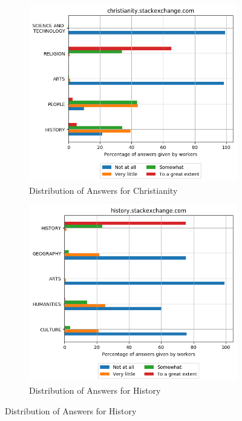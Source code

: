 \begin{figure}[H]
        
     \begin{subfigure}{0.5\textwidth}
    \centering
        \includegraphics[width=1\linewidth]{imgs/crowd-results/christianity_stackexchange_com}
        \caption{Distribution of Answers for Christianity}
        \label{fig:crowd-results-christianity}
    \end{subfigure}%
    \begin{subfigure}{0.5\textwidth}
    \centering
        \includegraphics[width=1\linewidth]{imgs/crowd-results/history_stackexchange_com}
        \caption {Distribution of Answers for  History}
        \label{fig:crowd-results-history}
    \end{subfigure} 

    \end{figure}
    
